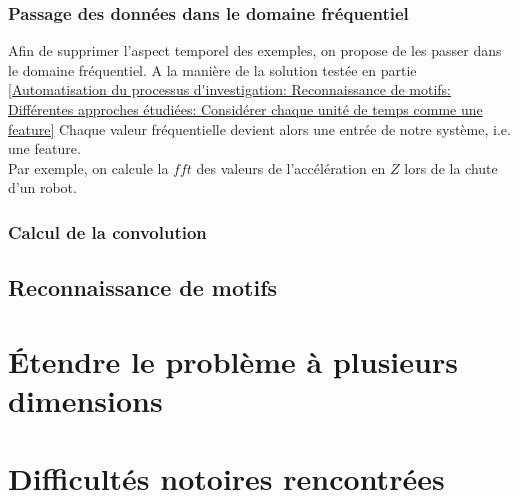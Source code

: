 \subsubsection{Passage des données dans le domaine fréquentiel}
\label{Automatisation du processus d'investigation: Reconnaissance de motifs: Différentes approches étudiées: Passage des données dans le domaine fréquentiel}
Afin de supprimer l'aspect temporel des exemples, on propose de les passer dans le domaine fréquentiel. A la manière de la solution testée en partie \ref{Automatisation du processus d'investigation: Reconnaissance de motifs: Différentes approches étudiées: Considérer chaque unité de temps comme une feature} Chaque valeur fréquentielle devient alors une entrée de notre système, i.e. une feature. \\

Par exemple, on calcule la $fft$ des valeurs de l'accélération en $Z$ lors de la chute d'un robot.  

\subsubsection{Calcul de la convolution}
\label{Automatisation du processus d'investigation: Reconnaissance de motifs: Différentes approches étudiées: Calcul de la convolution}



\subsection{Reconnaissance de motifs}
\label{Automatisation du processus d'investigation: Reconnaissance de motifs: Concept}




\section{Étendre le problème à plusieurs dimensions }
\label{Automatisation du processus d'investigation: Étendre le problème à plusieurs dimensions}





\section{Difficultés notoires rencontrées}
\label{Automatisation du processus d'investigation: Difficultés notoires rencontrées}




